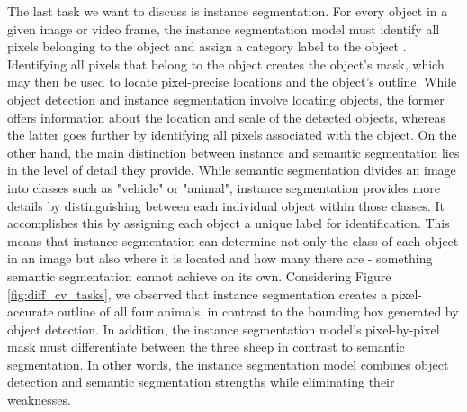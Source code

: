 The last task we want to discuss is instance segmentation. For every object in a given image or video frame, the instance segmentation model must identify all pixels belonging to the object and assign a category label to the object \cite{overview_cv_task}. Identifying all pixels that belong to the object creates the object's mask, which may then be used to locate pixel-precise locations and the object's outline. While object detection and instance segmentation involve locating objects, the former offers information about the location and scale of the detected objects, whereas the latter goes further by identifying all pixels associated with the object. On the other hand, the main distinction between instance and semantic segmentation lies in the level of detail they provide. While semantic segmentation divides an image into classes such as "vehicle" or "animal", instance segmentation provides more details by distinguishing between each individual object within those classes. It accomplishes this by assigning each object a unique label for identification. This means that instance segmentation can determine not only the class of each object in an image but also where it is located and how many there are - something semantic segmentation cannot achieve on its own. Considering Figure \ref{fig:diff_cv_tasks}, we observed that instance segmentation creates a pixel-accurate outline of all four animals, in contrast to the bounding box generated by object detection. In addition, the instance segmentation model's pixel-by-pixel mask must differentiate between the three sheep in contrast to semantic segmentation. In other words, the instance segmentation model combines object detection and semantic segmentation strengths while eliminating their weaknesses.




